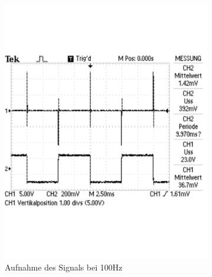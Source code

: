 \documentclass[12pt,a4paper]{article}
\begin{document}
\begin{figure}[H]
        \centering
        \begin{subfigure}[b]{0.28\textwidth}
                \includegraphics[width=\textwidth , scale = 0.4]{2_5_recht_100.pdf}
                \caption[Aufnahme des Signals bei 100Hz]{Aufnahme des Signals bei 100Hz}
                \label{fig:2_5_recht_100}
        \end{subfigure}%
        \hfill
        \begin{subfigure}[b]{0.28\textwidth}

\end{subfigure}
\end{figure}
\end{document}
